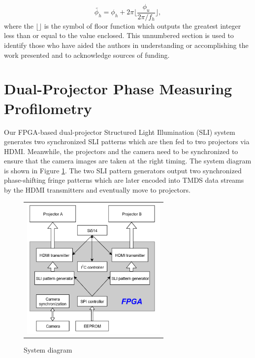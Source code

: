 \documentclass[]{spie}  %
\begin{document}
  \begin{equation} \label{eq:1.10}
	 \tilde{\phi_h} = \phi_h + 2\pi \lfloor\frac{\phi_u}{2\pi/f_h}\rfloor,
  \end{equation}
where the $\lfloor \rfloor$ is the symbol of floor function which outputs the greatest integer less than or equal to the value enclosed.
\acknowledgments     %
This unnumbered section is used to identify those who have aided the authors in understanding or accomplishing the work presented and to acknowledge sources of funding.  

\section{Dual-Projector Phase Measuring Profilometry}
Our FPGA-based dual-projector Structured Light Illumination (SLI) system generates two synchronized SLI patterns which are then fed to two projectors via HDMI. Meanwhile, the projectors and the camera need to be synchronized to ensure that the camera images are taken at the right timing. The system diagram is shown in Figure \ref{Fig:1}. The two SLI pattern generators output two synchronized phase-shifting fringe patterns which are later encoded into TMDS data streams by the HDMI transmitters and eventually move to projectors. 

\begin{figure}
   \begin{center}
   \begin{tabular}{c}
   \includegraphics[height=7cm]{sysdg.png}
   \end{tabular}
   \end{center}
   \caption{System diagram}
   \label{Fig:1}
   \end{figure} 
\end{document}
